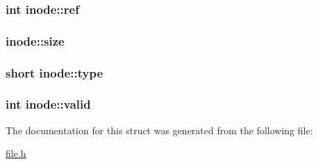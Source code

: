 \subsubsection[{\texorpdfstring{ref}{ref}}]{\setlength{\rightskip}{0pt plus 5cm}int inode\+::ref}\hypertarget{structinode_a6a519028ee67f805482b3e1725bf09c5}{}\label{structinode_a6a519028ee67f805482b3e1725bf09c5}
\subsubsection[{\texorpdfstring{size}{size}}]{ inode\+::size}\hypertarget{structinode_a918af769c48a8ca8afac057bf83d12de}{}\label{structinode_a918af769c48a8ca8afac057bf83d12de}
\subsubsection[{\texorpdfstring{type}{type}}]{\setlength{\rightskip}{0pt plus 5cm}short inode\+::type}\hypertarget{structinode_a8d74bec2898785c057111c328d23fda2}{}\label{structinode_a8d74bec2898785c057111c328d23fda2}
\subsubsection[{\texorpdfstring{valid}{valid}}]{\setlength{\rightskip}{0pt plus 5cm}int inode\+::valid}\hypertarget{structinode_aad324382ba30eb83daa5304fce7dca08}{}\label{structinode_aad324382ba30eb83daa5304fce7dca08}


The documentation for this struct was generated from the following file\+:\begin{DoxyCompactItemize}
\item 
\hyperlink{file_8h}{file.\+h}\end{DoxyCompactItemize}
